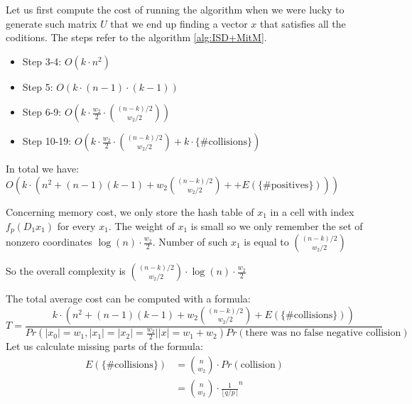 \documentclass[12pt]{article}
\begin{document}
Let us first compute the cost of running the algorithm when we were lucky to generate such matrix $U$ that we end up finding a vector $x$ that satisfies all the coditions. The steps refer to the algorithm \ref{alg:ISD+MitM}.
\begin{itemize}
    \item Step 3-4: $O(k \cdot n^2)$
    \item Step 5: $O(k \cdot (n-1) \cdot (k-1))$
    \item Step 6-9: $O(k \cdot \frac{w_2}{2} \cdot \binom{(n-k)/2}{w_2/2})$
    \item Step 10-19: $O(k \cdot \frac{w_2}{2} \cdot \binom{(n-k)/2}{w_2/2} + k \cdot \{\text{\# collisions}\})$
\end{itemize}
In total we have: $O(k \cdot (n^2 + (n-1)(k-1) + w_2\binom{(n-k)/2}{w_2/2} + + E(\{\text{\# positives}\})))$

Concerning memory cost, we only store the hash table of $x_1$ in a cell with index $f_{p}(D_1x_1)$ for every $x_1$.
The weight of $x_1$ is small so we only remember the set of nonzero coordinates $\log(n) \cdot \frac{w_2}{2}$. Number of such $x_1$ is equal to $\binom{(n-k)/2}{w_2/2}$

So the overall complexity is  $\binom{(n-k)/2}{w_2/2} \cdot \log(n) \cdot \frac{w_2}{2}$

The total average cost can be computed with a formula:
\[
    T = \frac{k \cdot (n^2 + (n-1)(k-1) + w_2\binom{(n-k)/2}{w_2/2} + E(\{\text{\# collisions}\}))}{Pr(|x_0| = w_1, |x_1| = |x_2| = \frac{w_2}{2} | |x| = w_1+w_2)Pr(\text{there was no false negative collision})}
\]
Let us calculate missing parts of the formula:
\[
\begin{split}
    E(\{\text{\# collisions}\}) & = \binom{n}{w_2} \cdot Pr(\text{collision}) \\
    & =  \binom{n}{w_2} \cdot  \frac{1}{\lfloor q/p \rceil}^{n}
\end{split}
\]
\end{document}
